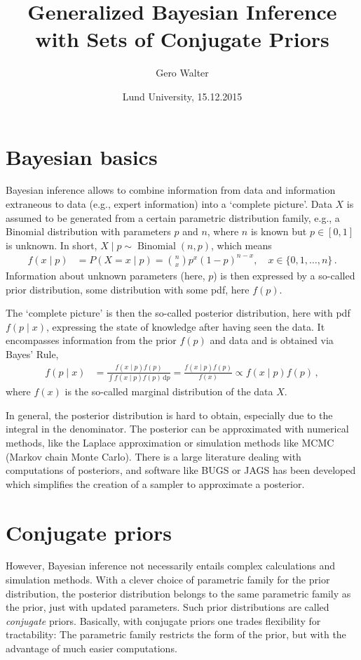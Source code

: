 \documentclass[12pt,a4paper	,twoside]{article}
\title{Generalized Bayesian Inference\\ with Sets of Conjugate Priors}
\author{Gero Walter}
\date{Lund University, 15.12.2015}
\newcommand{\dd}{\,\mathrm{d}}
\newcommand{\bin}{\operatorname{Binomial}}
\begin{document}
\maketitle

\section{Bayesian basics}

Bayesian inference allows to combine information from data
and information extraneous to data (e.g., expert information)
into a `complete picture'.
Data $X$ is assumed to be generated from a certain parametric distribution family,
e.g., a Binomial distribution with parameters $p$ and $n$,
where $n$ is known but $p \in [0,1]$ is unknown.
In short, $X\mid p \sim \bin(n,p)$, which means
\begin{align*}
f(x\mid p) &= P(X = x \mid p) = {n \choose x} p^x (1-p)^{n-x},\quad x \in \{0, 1, \ldots, n\}\,.
\end{align*}
Information about unknown parameters (here, $p$) is then expressed
by a so-called prior distribution, some distribution with some pdf, here $f(p)$.

The `complete picture' is then the so-called posterior distribution,
here with pdf $f(p\mid x)$, expressing the state of knowledge after having seen the data.
It encompasses information from the prior $f(p)$ and data
and is obtained via Bayes' Rule,
\begin{align}
f(p \mid x) &= \frac{f(x\mid p) f(p)}{\int f(x\mid p) f(p) \dd p}
             = \frac{f(x\mid p) f(p)}{f(x)} \propto f(x\mid p) f(p)\,,
\label{eq:bayesrule}
\end{align}
where $f(x)$ is the so-called marginal distribution of the data $X$.

In general, the posterior distribution is hard to obtain,
especially due to the integral in the denominator.
The posterior can be approximated with numerical methods,
like the Laplace approximation or simulation methods like MCMC (Markov chain Monte Carlo).
There is a large literature dealing with computations of posteriors,
and software like BUGS or JAGS has been developed
which simplifies the creation of a sampler to approximate a posterior.


\section{Conjugate priors}

However, Bayesian inference not necessarily entails complex calculations and simulation methods.
With a clever choice of parametric family for the prior distribution,
the posterior distribution belongs to the same parametric family as the prior,
just with updated parameters.
Such prior distributions are called \emph{conjugate} priors.
Basically, with conjugate priors one trades flexibility for tractability:
The parametric family restricts the form of the prior,
but with the advantage of much easier computations.
\end{document}
